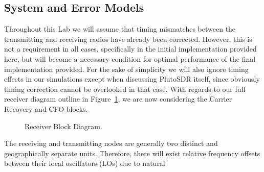 \documentclass[letterpaper,12pt]{article}
\begin{document}
\subsection{System and Error Models}\label{sec:models}
Throughout this Lab we will assume that timing mismatches between the transmitting and
receiving radios have already been corrected. However, this is not a requirement in all cases, specifically in
the initial implementation provided here, but will become a necessary condition for optimal performance
of the final implementation provided. For the sake of simplicity we will also ignore timing effects in
our simulations except when discussing PlutoSDR itself, since obviously timing correction cannot be
overlooked in that case. With regards to our full receiver diagram outline in Figure~\ref{rbd}, we are now
considering the Carrier Recovery and CFO blocks.\par
%
\begin{figure}[!htp]
 \centering
  \caption{Receiver Block Diagram.}
  \label{rbd}
\end{figure}
%
The receiving and transmitting nodes are generally two distinct and geographically separate units.  
Therefore, there will exist relative frequency offsets between their local oscillators (LOs) due to natural 
\end{document}
